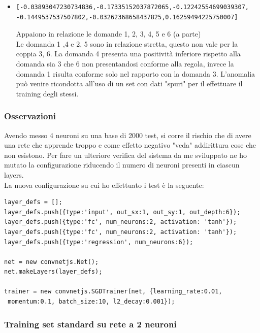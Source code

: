 \documentclass[10pt,a4paper]{article}
\begin{document}
\begin{itemize}
\item  \begin{verbatim}[-0.03893047230734836,-0.17335152037872065,-0.12242554699039307,
-0.1449537537507802,-0.03262368658437825,0.16259494225750007]\end{verbatim}
Appaiono in relazione le domande 1, 2, 3, 4, 5  e 6 (a parte)\\
Le domanda 1 ,4 e 2, 5  sono in relazione stretta, questo non vale per la coppia 3, 6. La domanda 4 presenta una positivit\`a inferiore rispetto alla domanda sia 3 che 6 non presentandosi conforme alla regola, invece la domanda 1 risulta conforme solo nel rapporto con la domanda 3. L'anomalia pu\`o venire ricondotta all'uso di un set con dati "spuri" per il effettuare il training degli stessi.
\end{itemize}

\subsubsection{Osservazioni}
\label{Osservazioni su rete a 4 neuroni}

Avendo messo 4 neuroni su una base di 2000 test, si corre il rischio che di avere una rete che apprende troppo e come effetto negativo "veda" addirittura cose che non esistono.
Per fare un ulteriore verifica del sistema da me sviluppato ne ho mutato la configurazione riducendo il numero di neuroni presenti in ciascun layers.\\
La nuova configurazione su cui ho effettuato i test \`e la seguente:

\begin{verbatim}layer_defs = [];
layer_defs.push({type:'input', out_sx:1, out_sy:1, out_depth:6});
layer_defs.push({type:'fc', num_neurons:2, activation: 'tanh'});
layer_defs.push({type:'fc', num_neurons:2, activation: 'tanh'});
layer_defs.push({type:'regression', num_neurons:6});

net = new convnetjs.Net();
net.makeLayers(layer_defs);

trainer = new convnetjs.SGDTrainer(net, {learning_rate:0.01,
 momentum:0.1, batch_size:10, l2_decay:0.001});
\end{verbatim}

\subsubsection{Training set standard su rete a 2 neuroni}
\label{Training set standard su rete a 2 neuroni}
\end{document}
